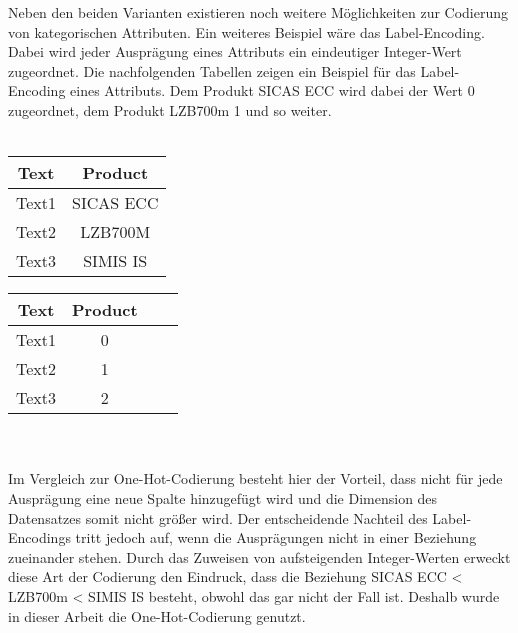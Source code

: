 Neben den beiden Varianten existieren noch weitere Möglichkeiten zur Codierung von kategorischen Attributen. Ein weiteres Beispiel wäre das Label-Encoding. Dabei wird jeder Ausprägung eines Attributs
ein eindeutiger Integer-Wert zugeordnet. Die nachfolgenden Tabellen zeigen ein Beispiel für das Label-Encoding eines Attributs. Dem Produkt \glqq SICAS ECC\grqq{} wird dabei der Wert 0 zugeordnet,
dem Produkt \glqq LZB700m\grqq{} 1 und so weiter. 
\\
\\
\begin{minipage}[c]{0.5\textwidth}
    \centering
    \begin{tabular}{|c|c|}
        \hline
        \textbf{Text} & \textbf{Product}\\ \hline
        Text1 & SICAS ECC\\
        Text2 & LZB700M\\
        Text3 & SIMIS IS\\
        \hline
    \end{tabular}
\end{minipage}
\begin{minipage}[c]{0.5\textwidth}
    \centering
    \begin{tabular}{|c|c|c|c|}
        \hline
        \textbf{Text} & \textbf{Product} \\ \hline
        Text1 & 0\\
        Text2 & 1\\
        Text3 & 2\\
        \hline
    \end{tabular}
\end{minipage}
\\
\\
Im Vergleich zur One-Hot-Codierung besteht hier der Vorteil, dass nicht für jede Ausprägung eine neue Spalte hinzugefügt wird und 
die Dimension des Datensatzes somit nicht größer wird. Der entscheidende Nachteil des Label-Encodings tritt jedoch auf, wenn die Ausprägungen nicht in einer Beziehung zueinander stehen.
Durch das Zuweisen von aufsteigenden Integer-Werten erweckt diese Art der Codierung den Eindruck, dass die Beziehung \glqq SICAS ECC\grqq{} < \glqq LZB700m\grqq{} < \glqq SIMIS IS\grqq{} besteht,
obwohl das gar nicht der Fall ist. Deshalb wurde in dieser Arbeit die One-Hot-Codierung genutzt.
